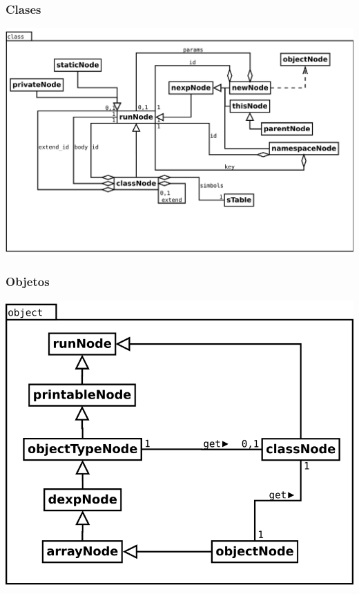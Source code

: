 \subsubsection {Clases}
\begin{center}
\includegraphics[scale=0.4]{class.png} \\
\end{center}

\subsubsection {Objetos}
\begin{center}
\includegraphics[scale=0.4]{object.png} \\
\end{center}

